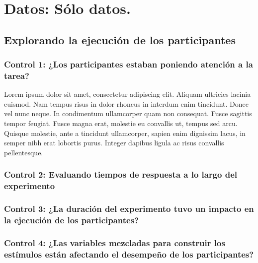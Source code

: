 
\chapter{Datos: Sólo datos.} %

\label{Cap_Data} %

\section{Explorando la ejecución de los participantes}



\subsection{Control 1: ¿Los participantes estaban poniendo atención a la tarea?}

Lorem ipsum dolor sit amet, consectetur adipiscing elit. Aliquam ultricies lacinia euismod. Nam tempus risus in dolor rhoncus in interdum enim tincidunt. Donec vel nunc neque. In condimentum ullamcorper quam non consequat. Fusce sagittis tempor feugiat. Fusce magna erat, molestie eu convallis ut, tempus sed arcu. Quisque molestie, ante a tincidunt ullamcorper, sapien enim dignissim lacus, in semper nibh erat lobortis purus. Integer dapibus ligula ac risus convallis pellentesque.

\subsection{Control 2: Evaluando tiempos de respuesta a lo largo del experimento}

\subsection{Control 3: ¿La duración del experimento tuvo un impacto en la ejecución de los participantes?}

\subsection{Control 4: ¿Las variables mezcladas para construir los estímulos están afectando el desempeño de los participantes?}


